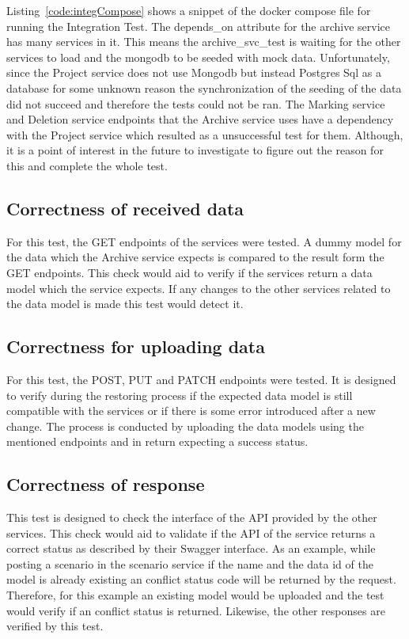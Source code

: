 Listing~\ref{code:integCompose} shows a snippet of the docker compose file for running the Integration Test. The depends\_on attribute for the archive service
has many services in it. This means the archive\_svc\_test is waiting for the other services to load and the mongodb to be seeded with mock data. Unfortunately,
since the Project service does not use Mongodb but instead Postgres Sql as a database for some unknown reason the synchronization of the seeding of the data
did not succeed and therefore the tests could not be ran. The
Marking service and Deletion service endpoints that the Archive service uses have a dependency with the Project service  which resulted as a unsuccessful test
for them. Although, it is a point of interest in the future to investigate to figure out the reason for this and complete the whole test.

\subsection{Correctness of received data}
For this test, the GET endpoints of the services were tested. A dummy model for the data which the Archive service expects is compared to the result
form the GET endpoints. This check would aid to verify if the services return a data model which the service expects. If any changes to the other services
related to the data model is made this test would detect it. 

\subsection{Correctness for uploading data}
For this test, the POST, PUT and PATCH endpoints were tested. It is designed to verify during the restoring process if the expected data model 
is still compatible with the services or if there is some error introduced after a new change. The process is conducted by uploading the 
data models using the mentioned endpoints and in return expecting a success status.

\subsection{Correctness of response}
This test is designed to check the interface of the API provided by the other services. This check would aid to validate if the API of the
service returns a correct status as described by their Swagger interface. As an example, while posting a scenario in the scenario service if the
name and the data id of the model is already existing an conflict status code will be returned by the request. Therefore, for this example an existing
model would be uploaded and the test would verify if an conflict status is returned. Likewise, the other responses are verified by this test. 

